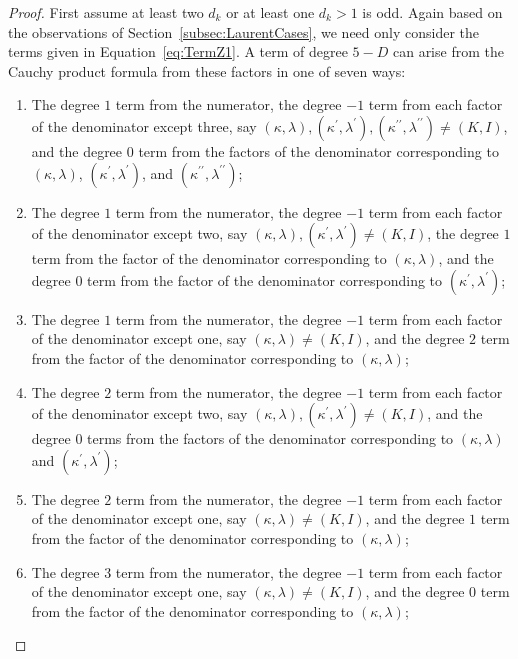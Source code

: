 \documentclass{amsart}
\theoremstyle{definition}
\theoremstyle{remark}
\begin{document}
\begin{proof}
First assume at least two $d_k$ or at least one $d_k > 1$ is odd. Again based on the observations of
Section~\ref{subsec:LaurentCases}, we need only consider the terms given in Equation~\eqref{eq:TermZ1}.
A term of degree $5-D$ can arise from the Cauchy product formula from these factors in one of seven ways:
\begin{enumerate}
\item   The degree $1$ term from the numerator, the degree $-1$ term from each factor of the
        denominator except three, say
        $(\kappa,\lambda), (\kappa^\prime,\lambda^\prime), (\kappa^{\prime\prime},\lambda^{\prime\prime}) \neq (K,I)$,
        and the degree $0$ term from the factors of the denominator corresponding to $(\kappa,\lambda)$,
        $(\kappa^\prime,\lambda^\prime)$, and $(\kappa^{\prime\prime}, \lambda^{\prime\prime})$;

\item   The degree $1$ term from the numerator, the degree $-1$ term from each factor of the denominator except
        two, say $(\kappa,\lambda), (\kappa^\prime,\lambda^\prime) \neq (K,I)$, the degree $1$ term from the factor
        of the denominator corresponding to $(\kappa,\lambda)$, and the degree $0$ term from the factor
        of the denominator corresponding to $(\kappa^\prime,\lambda^\prime)$;

\item   The degree $1$ term from the numerator, the degree $-1$ term from each factor of the denominator except
        one, say $(\kappa,\lambda) \neq (K,I)$, and the degree $2$ term from the factor
        of the denominator corresponding to $(\kappa,\lambda)$;

\item   The degree $2$ term from the numerator, the degree $-1$ term from each factor of the denominator except
        two, say $(\kappa,\lambda), (\kappa^\prime,\lambda^\prime) \neq (K,I)$, and the degree $0$ terms from the factors
        of the denominator corresponding to $(\kappa,\lambda)$ and $(\kappa^\prime,\lambda^\prime)$;

\item   The degree $2$ term from the numerator, the degree $-1$ term from each factor of the denominator except
        one, say $(\kappa,\lambda) \neq (K,I)$, and the degree $1$ term from the factor
        of the denominator corresponding to $(\kappa,\lambda)$;

\item   The degree $3$ term from the numerator, the degree $-1$ term from each factor of the denominator except
        one, say $(\kappa,\lambda) \neq (K,I)$, and the degree $0$ term from the factor
        of the denominator corresponding to $(\kappa,\lambda)$;


\end{enumerate}
\end{proof}
\end{document}
